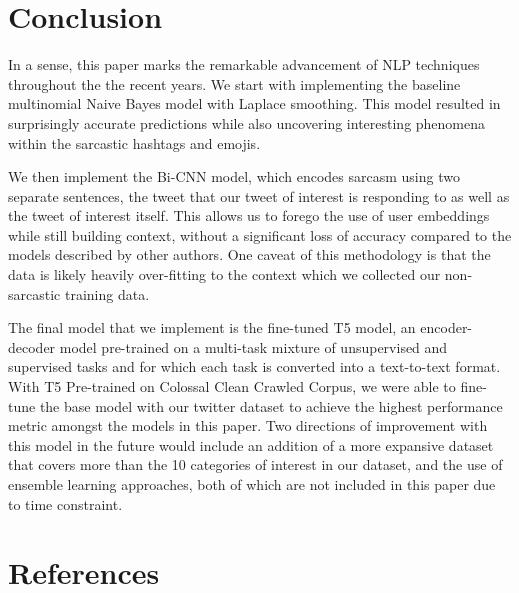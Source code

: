 \documentclass[11pt,a4paper]{article}
\begin{document}
\section{Conclusion}

In a sense, this paper marks the remarkable advancement of NLP techniques throughout the the recent years. We start with implementing the baseline multinomial Naive Bayes model with Laplace smoothing. This model resulted in surprisingly accurate predictions while also uncovering interesting phenomena within the sarcastic hashtags and emojis.

We then implement the  Bi-CNN model, which encodes sarcasm using two separate sentences, the tweet that our tweet of interest is responding to as well as the tweet of interest itself. This allows us to forego the use of user embeddings while still building context, without a significant loss of accuracy compared to the models described by other authors. One caveat of this methodology is that the data is likely heavily over-fitting to the context which we collected our non-sarcastic training data.

The final model that we implement is the fine-tuned T5 model, an encoder-decoder model pre-trained on a multi-task mixture of unsupervised and supervised tasks and for which each task is converted into a text-to-text format. With T5 Pre-trained on Colossal Clean Crawled Corpus, we were able to fine-tune the base model with our twitter dataset to achieve the highest performance metric amongst the models in this paper. Two directions of improvement with this model in the future would include an addition of a more expansive dataset that covers more than the 10 categories of interest in our dataset, and the use of ensemble learning approaches, both of which are not included in this paper due to time constraint.
\section{References}
\end{document}
